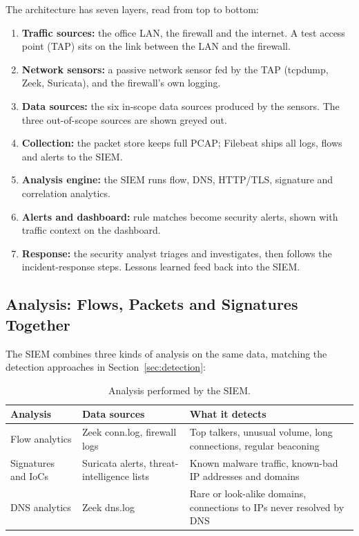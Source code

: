The architecture has seven layers, read from top to bottom:
\begin{enumerate}
  \item \textbf{Traffic sources:} the office LAN, the firewall and the internet. A test access point (TAP) sits on the link between the LAN and the firewall.
  \item \textbf{Network sensors:} a passive network sensor fed by the TAP (tcpdump, Zeek, Suricata), and the firewall's own logging.
  \item \textbf{Data sources:} the six in-scope data sources produced by the sensors. The three out-of-scope sources are shown greyed out.
  \item \textbf{Collection:} the packet store keeps full PCAP; Filebeat ships all logs, flows and alerts to the SIEM.
  \item \textbf{Analysis engine:} the SIEM runs flow, DNS, HTTP/TLS, signature and correlation analytics.
  \item \textbf{Alerts and dashboard:} rule matches become security alerts, shown with traffic context on the dashboard.
  \item \textbf{Response:} the security analyst triages and investigates, then follows the incident-response steps. Lessons learned feed back into the SIEM.
\end{enumerate}

\subsection{Analysis: Flows, Packets and Signatures Together}

The SIEM combines three kinds of analysis on the same data, matching the detection approaches in Section~\ref{sec:detection}:

\begin{table}[htbp]
  \centering
  \caption{Analysis performed by the SIEM.}
  \label{tab:arch-analysis}
  \footnotesize
  \begin{tabularx}{\linewidth}{@{}lYY@{}}
    \toprule
    \textbf{Analysis} & \textbf{Data sources} & \textbf{What it detects} \\
    \midrule
    Flow analytics & Zeek conn.log, firewall logs & Top talkers, unusual volume, long connections, regular beaconing \\
    Signatures and IoCs & Suricata alerts, threat-intelligence lists & Known malware traffic, known-bad IP addresses and domains \\
    DNS analytics & Zeek dns.log & Rare or look-alike domains, connections to IPs never resolved by DNS \\
    \bottomrule
  \end{tabularx}
\end{table}

